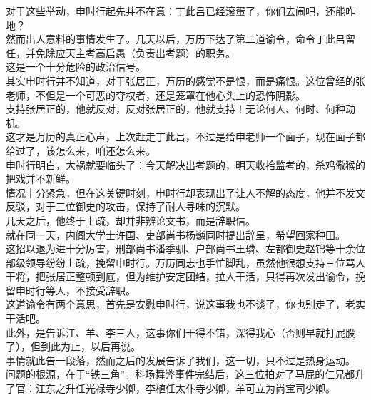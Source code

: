 \begin{multicols}{\theparacolNo}
对于这些举动，申时行起先并不在意：丁此吕已经滚蛋了，你们去闹吧，还能咋地？\\

然而出人意料的事情发生了。几天以后，万历下达了第二道谕令，命令丁此吕留任，并免除应天主考高启愚（负责出考题）的职务。\\

这是一个十分危险的政治信号。\\

其实申时行并不知道，对于张居正，万历的感觉不是恨，而是痛恨。这位曾经的张老师，不但是一个可恶的夺权者，还是笼罩在他心头上的恐怖阴影。\\

支持张居正的，他就反对，反对张居正的，他就支持！无论何人、何时、何种动机。\\

这才是万历的真正心声，上次赶走丁此吕，不过是给申老师一个面子，现在面子都给过了，该怎么来，咱还怎么来。\\

申时行明白，大祸就要临头了：今天解决出考题的，明天收拾监考的，杀鸡儆猴的把戏并不新鲜。\\

情况十分紧急，但在这关键时刻，申时行却表现出了让人不解的态度，他并不发文反驳，对于三位御史的攻击，保持了耐人寻味的沉默。\\

几天之后，他终于上疏，却并非辨论文书，而是辞职信。\\

就在同一天，内阁大学士许国、吏部尚书杨巍同时提出辞呈，希望回家种田。\\

这招以退为进十分厉害，刑部尚书潘季驯、户部尚书王璘、左都御史赵锦等十余位部级领导纷纷上疏，挽留申时行。万历同志也手忙脚乱，虽然他很想支持三位骂人干将，把张居正整顿到底，但为维护安定团结，拉人干活，只得再次发出谕令，挽留申时行等人，不接受辞职。\\

这道谕令有两个意思，首先是安慰申时行，说这事我也不谈了，你也别走了，老实干活吧。\\

此外，是告诉江、羊、李三人，这事你们干得不错，深得我心（否则早就打屁股了），但到此为止，以后再说。\\

事情就此告一段落，然而之后的发展告诉了我们，这一切，只不过是热身运动。\\

问题的根源，在于“铁三角”。科场舞弊事件完结后，这三位拍对了马屁的仁兄都升了官：江东之升任光禄寺少卿，李植任太仆寺少卿，羊可立为尚宝司少卿。\\


\end{multicols}
